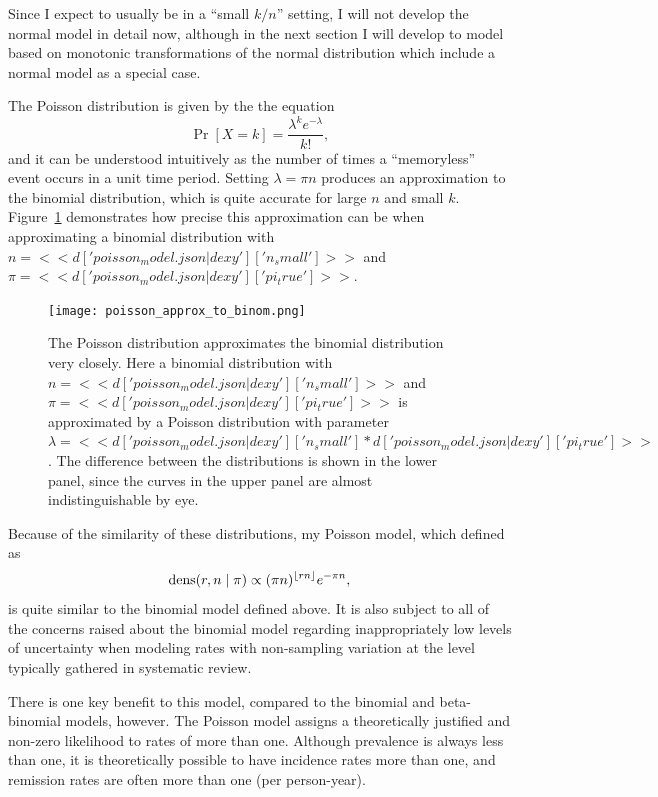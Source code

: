 Since I expect to usually be in a ``small $k/n$'' setting, I will not
develop the normal model in detail now, although in the next section I
will develop to model based on monotonic transformations of the normal
distribution which include a normal model as a special case.

The Poisson distribution is given by the the equation
\[
\Pr[X=k] = \frac{\lambda^k e^{-\lambda}}{k!},
\]
and it can be understood intuitively as the number of times a
``memoryless'' event occurs in a unit time period.  Setting $\lambda =
\pi n$ produces an approximation to the binomial distribution, which
is quite accurate for large $n$ and small $k$.
Figure~\ref{fig:theory-rate_model-poisson_approx_to_binom}
demonstrates how precise this approximation can be when approximating
a binomial distribution with
$n=<<d['poisson_model.json|dexy']['n_small']>>$ and
$\pi=<<d['poisson_model.json|dexy']['pi_true']>>$.

\begin{figure}
\begin{center}
\texttt{[image: poisson\_approx\_to\_binom.png]}
\end{center}
\caption{The Poisson distribution approximates the binomial
  distribution very closely. Here a binomial distribution with
  $n=<<d['poisson_model.json|dexy']['n_small']>>$ and
  $\pi=<<d['poisson_model.json|dexy']['pi_true']>>$ is approximated by
  a Poisson distribution with parameter
  $\lambda=<<d['poisson_model.json|dexy']['n_small'] *
  d['poisson_model.json|dexy']['pi_true']>>$.  The difference between
  the distributions is shown in the lower panel, since the curves in
  the upper panel are almost indistinguishable by eye.}
\label{fig:theory-rate_model-poisson_approx_to_binom}
\end{figure}

Because of the similarity of these distributions, my Poisson model,
which defined as
\[
\operatorname{dens}(r,n\;|\; \pi) \propto (\pi n)^{\lfloor rn\rfloor} e^{-\pi n},
\]
is quite similar to the binomial model defined above.  It is also subject to all of the concerns raised about the
binomial model regarding inappropriately low levels of uncertainty
when modeling rates with non-sampling variation at the level typically
gathered in systematic review.

There is one key benefit to this model, compared to the binomial and
beta-binomial models, however.  The Poisson model assigns a
theoretically justified and non-zero likelihood to rates of more than
one.  Although prevalence is always less than one, it is theoretically
possible to have incidence rates more than one, and remission rates
are often more than one (per person-year).

